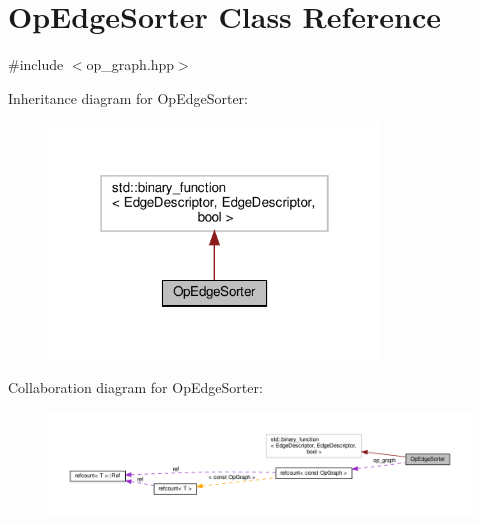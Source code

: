 \hypertarget{classOpEdgeSorter}{}\section{Op\+Edge\+Sorter Class Reference}
\label{classOpEdgeSorter}


{\ttfamily \#include $<$op\+\_\+graph.\+hpp$>$}



Inheritance diagram for Op\+Edge\+Sorter\+:
\nopagebreak
\begin{figure}[H]
\begin{center}
\leavevmode
\includegraphics[width=250pt]{d0/d34/classOpEdgeSorter__inherit__graph}
\end{center}
\end{figure}


Collaboration diagram for Op\+Edge\+Sorter\+:
\nopagebreak
\begin{figure}[H]
\begin{center}
\leavevmode
\includegraphics[width=350pt]{db/d41/classOpEdgeSorter__coll__graph}
\end{center}
\end{figure}

